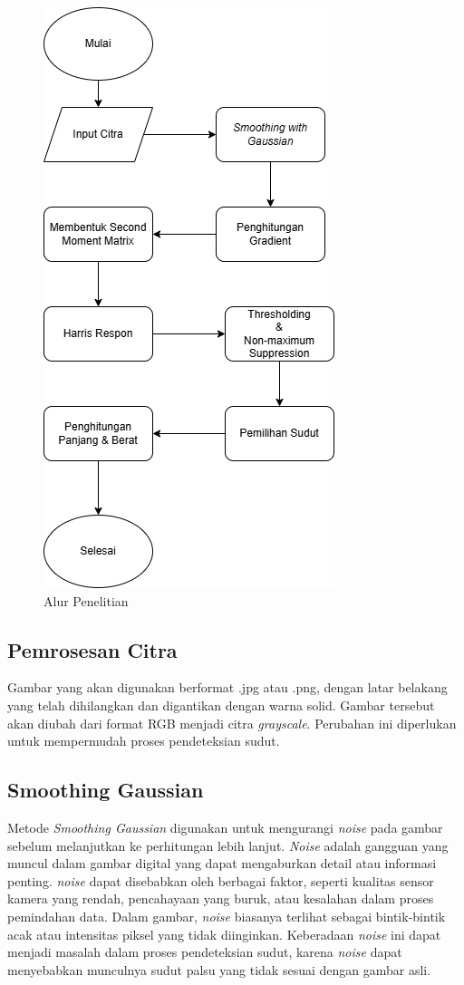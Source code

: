 \begin{figure}
    \centering
    \includegraphics[scale= 0.6]{gambar/Flowchar Penetianv2.png}
    \caption{Alur Penelitian}
    \label{Alur Penelitian}
\end{figure}

\subsection{Pemrosesan Citra}
    Gambar yang akan digunakan berformat .jpg atau .png, dengan latar belakang yang telah dihilangkan dan digantikan dengan warna solid. 
Gambar tersebut akan diubah dari format RGB menjadi citra \emph{grayscale}. Perubahan ini diperlukan untuk mempermudah proses pendeteksian sudut. 


\subsection{Smoothing Gaussian}
    Metode \emph{Smoothing Gaussian} digunakan untuk mengurangi \emph{noise} pada gambar sebelum melanjutkan ke perhitungan lebih lanjut.
\emph{Noise} adalah gangguan yang muncul dalam gambar digital yang dapat mengaburkan detail atau informasi penting. \emph{noise} dapat disebabkan oleh berbagai faktor, seperti kualitas sensor kamera yang rendah, pencahayaan yang buruk, atau kesalahan dalam proses pemindahan data.
Dalam gambar, \emph{noise} biasanya terlihat sebagai bintik-bintik acak atau intensitas piksel yang tidak diinginkan. Keberadaan \emph{noise} ini dapat menjadi masalah dalam proses pendeteksian sudut, karena \emph{noise} dapat menyebabkan munculnya sudut palsu yang tidak sesuai dengan gambar asli.
    
